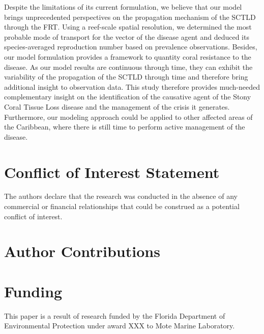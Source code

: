 \documentclass[utf8]{frontiersSCNS}
\begin{document}
Despite the limitations of its current formulation, we believe that our model brings unprecedented perspectives on the propagation mechanism of the SCTLD through the FRT. Using a reef-scale spatial resolution, we determined the most probable mode of transport for the vector of the disease agent and deduced its species-averaged reproduction number based on prevalence observations. Besides, our model formulation provides a framework to quantity coral resistance to the disease. As our model results are continuous through time, they can exhibit the variability of the propagation of the SCTLD through time and therefore bring additional insight to observation data. This study therefore provides much-needed complementary insight on the identification of the causative agent of the Stony Coral Tissue Loss disease and the management of the crisis it generates. Furthermore, our modeling approach could be applied to other affected areas of the Caribbean, where there is still time to perform active management of the disease.

% 

\section*{Conflict of Interest Statement}
The authors declare that the research was conducted in the absence of any commercial or financial relationships that could be construed as a potential conflict of interest.

\section*{Author Contributions}
  
\section*{Funding}
This paper is a result of research funded by the Florida Department of Environmental Protection under award XXX to Mote Marine Laboratory. 
\end{document}
